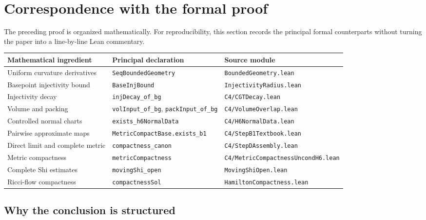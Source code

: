 \documentclass[11pt]{article}
\theoremstyle{plain}
\theoremstyle{definition}
\theoremstyle{remark}
\newcommand{\leanref}[1]{\nolinkurl{#1}}
\newcommand{\leanfile}[1]{\nolinkurl{#1}}
\begin{document}
\section{Correspondence with the formal proof}

The preceding proof is organized mathematically.  For reproducibility, this
section records the principal formal counterparts without turning the paper
into a line-by-line Lean commentary.

\begin{center}
\begin{tabular}{>{\raggedright\arraybackslash}p{}
                >{\raggedright\arraybackslash}p{}
                >{\raggedright\arraybackslash}p{}}
\toprule
Mathematical ingredient & Principal declaration & Source module \\
\midrule
Uniform curvature derivatives &
\leanref{SeqBoundedGeometry} &
\leanfile{BoundedGeometry.lean} \\
Basepoint injectivity bound &
\leanref{BaseInjBound} &
\leanfile{InjectivityRadius.lean} \\
Injectivity decay &
\leanref{injDecay_of_bg} &
\leanfile{C4/CGTDecay.lean} \\
Volume and packing &
\leanref{volInput_of_bg}, \leanref{packInput_of_bg} &
\leanfile{C4/VolumeOverlap.lean} \\
Controlled normal charts &
\leanref{exists_h6NormalData} &
\leanfile{C4/H6NormalData.lean} \\
Pairwise approximate maps &
\leanref{MetricCompactBase.exists_b1} &
\leanfile{C4/StepB1Textbook.lean} \\
Direct limit and complete metric &
\leanref{compactness_canon} &
\leanfile{C4/StepDAssembly.lean} \\
Metric compactness &
\leanref{metricCompactness} &
\leanfile{C4/MetricCompactnessUncondH6.lean} \\
Complete Shi estimates &
\leanref{movingShi_open} &
\leanfile{MovingShiOpen.lean} \\
Ricci-flow compactness &
\leanref{compactnessSol} &
\leanfile{HamiltonCompactness.lean} \\
\bottomrule
\end{tabular}
\end{center}

\subsection{Why the conclusion is structured}
\end{document}
